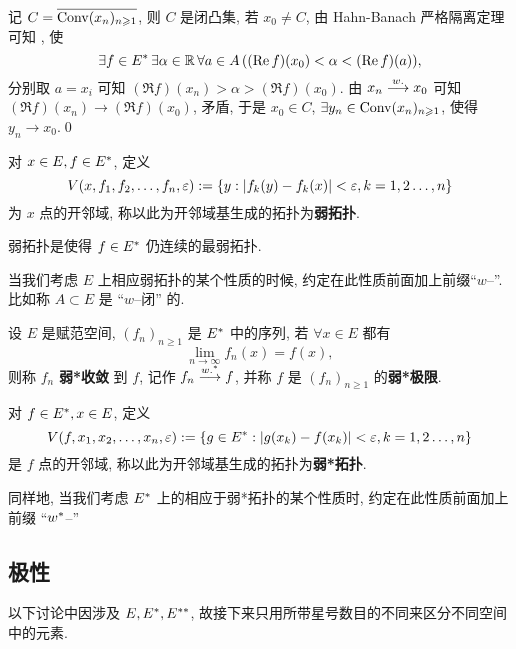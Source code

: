 	\begin{Proof}
		记 $ C = \overline{\operatorname{Conv}(x_{n})_{n\geqslant1}} $, 则 $ C $ 是闭凸集, 若 $ x_{0}\ne C $, 由 Hahn-Banach 严格隔离定理可知 $  $, 使
		\[
			\exists f\in E^{*}\,\exists\alpha\in\mathbb{R}\,\forall a\in A\,((\mathrm{Re\,} f)(x_{0})<\alpha<(\mathrm{Re\,} f)(a)),
		\]
		分别取 $ a=x_{i} $ 可知 $ (\Re f)(x_{n})>\alpha>(\Re f)(x_{0}) $. 由 $ x_{n}\overset{w.}{\longrightarrow} x_{0} $ 可知 $ (\Re f)(x_{n})\to (\Re f)(x_{0}) $, 矛盾, 于是 $ x_{0}\in C $, $ \exists y_{n}\in\operatorname{Conv}(x_{n})_{n\geqslant1} $, 使得 $ y_{n}\to x_{0} $.\qed
	\end{Proof}
	\begin{Definition}[弱拓扑]\label{def:弱拓扑}
		对 $ x\in E, f\in E^{*} $, 定义
		\[
			V(x, f_{1}, f_{2}, \dots, f_{n}, \varepsilon):=\{ y:\left| f_{k}(y)-f_{k}(x) \right| <\varepsilon, k=1, 2\dots, n \}
		\]
		为 $ x $ 点的开邻域, 称以此为开邻域基生成的拓扑为\textbf{弱拓扑}.
	\end{Definition}
	\begin{Remark}
		弱拓扑是使得 $ f\in E^{*} $ 仍连续的最弱拓扑.
	\end{Remark}
	\begin{Remark}
		当我们考虑 $ E $ 上相应弱拓扑的某个性质的时候, 约定在此性质前面加上前缀``$ w $--''. 比如称 $ A\subset E $ 是 ``$ w $--闭'' 的.
	\end{Remark}

	\begin{Definition}[弱*收敛]\label{def:弱*收敛}
		设 $ E $ 是赋范空间, $ (f_{n})_{n\geqslant1} $ 是 $ E^{*} $ 中的序列, 若 $ \forall x\in E $ 都有
		\[
			\lim_{n\to\infty}f_{n}(x)=f(x),
		\]
		则称 $ f_{n} $ \textbf{弱*收敛} 到 $ f $, 记作 $ f_{n}\overset{w.^{*}}{\longrightarrow} f $, 并称 $ f $ 是 $ (f_{n})_{n\geqslant1} $ 的\textbf{弱*极限}.
	\end{Definition}
	\begin{Definition}[弱*拓扑]\label{def:弱*拓扑}
		对 $ f\in E^{*}, x\in E $, 定义
		\[
			V(f, x_{1}, x_{2}, \dots, x_{n}, \varepsilon):=\{ g\in E^{*}:\left| g(x_{k})-f(x_{k}) \right| <\varepsilon, k=1, 2\dots, n \}
		\]
		是 $ f $ 点的开邻域, 称以此为开邻域基生成的拓扑为\textbf{弱*拓扑}.
	\end{Definition}
	\begin{Remark}
		同样地, 当我们考虑 $ E^{*} $ 上的相应于弱*拓扑的某个性质时, 约定在此性质前面加上前缀 ``$w^{*}$--''
	\end{Remark}

\subsection{极性}
	以下讨论中因涉及 $ E, E^{*}, E^{**} $, 故接下来只用所带星号数目的不同来区分不同空间中的元素.
	
